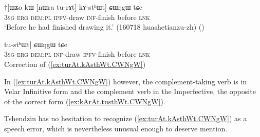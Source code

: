 \begin{exe}
\ex \label{ex:turAt.kAsthWt.CWNgW}
\gll $\dagger$[ɯʑo kɯ [nɯra tu-rɤt] kɤ-stʰɯt] ɕɯŋgɯ tɕe \\
\textsc{3sg} \textsc{erg} \textsc{dem}:\textsc{pl} \textsc{ipfv}-draw \textsc{inf}-finish before \textsc{lnk} \\
\glt `Before he had finished drawing it.' (160718 huashetianzu-zh)
()
\end{exe} 

\begin{exe}
\ex \label{ex:kArAt.tusthWt.CWNgW}
\gll [ɯʑo kɯ [nɯra kɤ-rɤt] tu-stʰɯt] ɕɯŋgɯ tɕe \\
\textsc{3sg} \textsc{erg} \textsc{dem}:\textsc{pl} \textsc{inf}-draw \textsc{ipfv}-finish before \textsc{lnk} \\
\glt Correction of (\ref{ex:turAt.kAsthWt.CWNgW})
\end{exe}   

In (\ref{ex:turAt.kAsthWt.CWNgW}) however, the complement-taking verb is in Velar Infinitive form and the complement verb in the Imperfective, the opposite of the correct form (\ref{ex:kArAt.tusthWt.CWNgW}).

Tshendzin has no hesitation to recognize (\ref{ex:turAt.kAsthWt.CWNgW}) as a speech error, which is nevertheless unusual enough to deserve mention.

